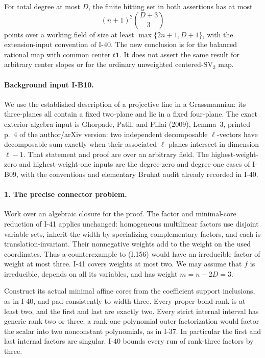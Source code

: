 For total degree at most $D$, the finite hitting set in both
assertions has at most
\[
 (n+1)^2\binom{D+3}{3}
 \tag{I.158}
\]
points over a working field of size at least
$\max\{2n+1,D+1\}$, with the extension-input convention of
I-40. The new conclusion is for the balanced rational map
with common center $t\mathbf1$. It does not assert the same
result for arbitrary center slopes or for the ordinary
unweighted centered-$\mathrm{SV}_2$ map.

\paragraph{Background input I-B10.}
We use the established description of a projective line in a
Grassmannian: its three-planes all contain a fixed two-plane
and lie in a fixed four-plane. The exact exterior-algebra
input is Ghorpade, Patil, and Pillai (2009), Lemma~3, printed
p.~4 of the author/arXiv version: two independent decomposable
$\ell$-vectors have decomposable sum exactly when their
associated $\ell$-planes intersect in dimension $\ell-1$.
That statement and proof are over an arbitrary field. The
highest-weight-zero and highest-weight-one inputs are the
degree-zero and degree-one cases of I-B09, with the conventions
and elementary Bruhat audit already recorded in I-40.

\paragraph{1. The precise connector problem.}
Work over an algebraic closure for the proof. The factor and
minimal-core reduction of I-41 applies unchanged: homogeneous
multilinear factors use disjoint variable sets, inherit the
width by specializing complementary factors, and each is
translation-invariant. Their nonnegative weights add to the
weight on the used coordinates. Thus a counterexample to
(I.156) would have an irreducible factor of weight at most
three. I-41 covers weights at most two. We may assume that
$f$ is irreducible, depends on all its variables, and has
weight $m=n-2D=3$.

Construct its actual minimal affine cores from the coefficient
support inclusions, as in I-40, and pad consistently to width
three. Every proper bond rank is at least two, and the first
and last are exactly two. Every strict internal interval has
generic rank two or three; a rank-one polynomial outer
factorization would factor the scalar into two nonconstant
polynomials, as in I-37. In particular the first and last
internal factors are singular. I-40 bounds every run of
rank-three factors by three.

